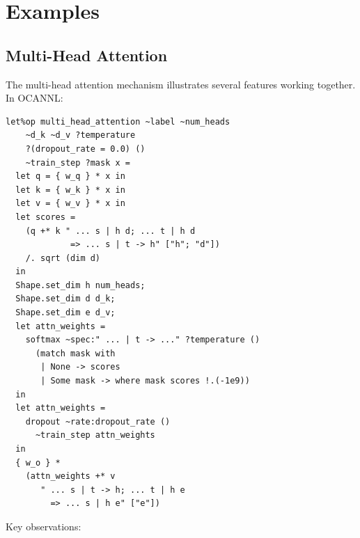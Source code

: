 \documentclass[acmsmall,nonacm,review]{acmart}
\newcommand{\code}[1]{\lstinline[basicstyle=\normalsize\ttfamily]{#1}}
\newcommand{\spec}[1]{\texttt{\small #1}}
\begin{document}
\section{Examples}
\label{sec:examples}

\subsection{Multi-Head Attention}
\label{sec:attention}

The multi-head attention mechanism illustrates several features working
together. In OCANNL:

\begin{lstlisting}
let%op multi_head_attention ~label ~num_heads
    ~d_k ~d_v ?temperature
    ?(dropout_rate = 0.0) ()
    ~train_step ?mask x =
  let q = { w_q } * x in
  let k = { w_k } * x in
  let v = { w_v } * x in
  let scores =
    (q +* k " ... s | h d; ... t | h d
             => ... s | t -> h" ["h"; "d"])
    /. sqrt (dim d)
  in
  Shape.set_dim h num_heads;
  Shape.set_dim d d_k;
  Shape.set_dim e d_v;
  let attn_weights =
    softmax ~spec:" ... | t -> ..." ?temperature ()
      (match mask with
       | None -> scores
       | Some mask -> where mask scores !.(-1e9))
  in
  let attn_weights =
    dropout ~rate:dropout_rate ()
      ~train_step attn_weights
  in
  { w_o } *
    (attn_weights +* v
       " ... s | t -> h; ... t | h e
         => ... s | h e" ["e"])
\end{lstlisting}

Key observations:
\end{document}
